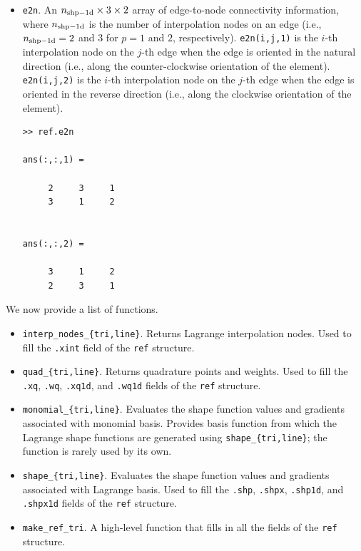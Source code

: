 \documentclass[openany,preprint,11pt]{article}
\begin{document}
\begin{itemize}
\item \texttt{e2n}. An $n_{\rm shp-1d} \times 3 \times 2$ array of edge-to-node connectivity information, where $n_{\rm shp-1d}$ is the number of interpolation nodes on an edge (i.e., $n_{\rm shp-1d} = 2$ and $3$ for $p=1$ and $2$, respectively). \texttt{e2n(i,j,1)} is the $i$-th interpolation node on the $j$-th edge when the edge is oriented in the natural direction (i.e., along the counter-clockwise orientation of the element). \texttt{e2n(i,j,2)} is the $i$-th interpolation node on the $j$-th edge when the edge is oriented in the reverse direction (i.e., along the clockwise orientation of the element).
\begin{verbatim}
>> ref.e2n

ans(:,:,1) =

     2     3     1
     3     1     2


ans(:,:,2) =

     3     1     2
     2     3     1
\end{verbatim}
\end{itemize}
We now provide a list of functions.
\begin{itemize}
\item \texttt{interp\_nodes\_\{tri,line\}}.  Returns Lagrange interpolation nodes.  Used to fill the \texttt{.xint} field of the \texttt{ref} structure.
\item \texttt{quad\_\{tri,line\}}.  Returns quadrature points and weights.  Used to fill the \texttt{.xq}, \texttt{.wq}, \texttt{.xq1d}, and \texttt{.wq1d} fields of the \texttt{ref} structure.
\item \texttt{monomial\_\{tri,line\}}.  Evaluates the shape function values and gradients associated with monomial basis.  Provides basis function from which the Lagrange shape functions are generated using \texttt{shape\_\{tri,line\}}; the function is rarely used by its own.
\item \texttt{shape\_\{tri,line\}}.  Evaluates the shape function values and gradients associated with Lagrange basis.  Used to fill the \texttt{.shp}, \texttt{.shpx}, \texttt{.shp1d}, and \texttt{.shpx1d} fields of the \texttt{ref} structure.
\item \texttt{make\_ref\_tri}.  A high-level function that fills in all the fields of the \texttt{ref} structure.
\end{itemize}
\end{document}
